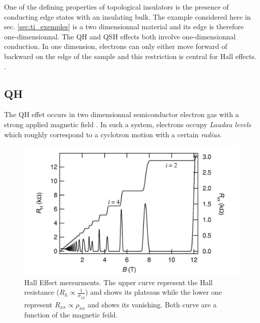 One of the defining properties of topological insulators is the presence of conducting edge states with an insulating bulk. The example considered here in sec. \ref{sec:ti_exemples} is a two dimensionnal material and its edge is therefore one-dimensionnal. The QH and QSH effects both involve one-dimensionnal conduction. In one dimension, electrons can only either move forward of backward on the edge of the sample and this restriction is central for Hall effects. \cite{qi_quantum_2010}. 
\subsection{QH}
The QH effet occurs in two dimensionnal semiconductor electron gas with a strong applied magnetic field \cite{qi_quantum_2010}. In such a system, electrons occupy \textit{Laudau levels} which roughly correspond to a cyclotron motion with a certain \textit{radius}.\cite{laughlin_quantized_1981}

\begin{figure}[h]
    \includegraphics[width=\columnwidth]{sections/visuel/Hall_effect.png}
    \caption{Hall Effect mersurments. The upper curve represent the Hall resistance ($R_h \propto \frac{1}{\sigma_{xy}}$) and shows its plateaus while the lower one represent $R_{xx} \propto \rho_{xx}$ and shows its vanishing. Both curve are a function of the magnetic feild. \cite{jeckelmann_quantum_nodate}}
    \label{fig:Hall_effet}
\end{figure}

